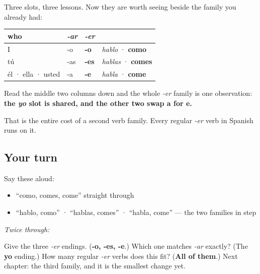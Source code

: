 \begin{grammarlens}[title={Grammar Lens: the table you have earned}]
Three slots, three lessons. Now they are worth seeing beside the family you already had:

\noindent
\begin{tabularx}{\linewidth}{@{}>{\raggedright\arraybackslash}X>{\raggedright\arraybackslash}X>{\raggedright\arraybackslash}X>{\raggedright\arraybackslash}X@{}}
\toprule
\textbf{who} & \textbf{\emph{-ar}} & \textbf{\emph{-er}} & \textbf{} \\
\midrule
I & -o & \textbf{-o} & \emph{hablo} · \textbf{como} \\
tú & -as & \textbf{-es} & \emph{hablas} · \textbf{comes} \\
él · ella · usted & -a & \textbf{-e} & \emph{habla} · \textbf{come} \\
\bottomrule
\end{tabularx}

Read the middle two columns down and the whole \emph{-er} family is one observation: \textbf{the \emph{yo} slot is shared, and the other two swap a for e.}

That is the entire cost of a second verb family. Every regular \emph{-er} verb in Spanish runs on it.
\end{grammarlens}

\subsection*{Your turn}
Say these aloud:

\begin{itemize}
\raggedright
  \item \textquotedblleft{}como, comes, come\textquotedblright{} straight through
  \item \textquotedblleft{}hablo, como\textquotedblright{} · \textquotedblleft{}hablas, comes\textquotedblright{} · \textquotedblleft{}habla, come\textquotedblright{} — the two families in step
\end{itemize}

\emph{Twice through:}

\begin{tcolorbox}[breakable,colback=teal!4,colframe=teal!35!black,title={Before you move on}]
Give the three \emph{-er} endings. (\textbf{-o, -es, -e}.) Which one matches \emph{-ar} exactly? (The \textbf{yo} ending.) How many regular \emph{-er} verbs does this fit? (\textbf{All of them}.) Next chapter: the third family, and it is the smallest change yet.
\end{tcolorbox}

